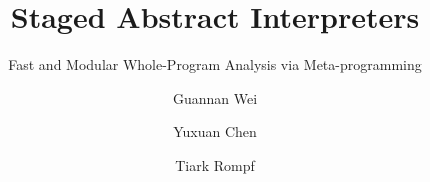 \documentclass[acmsmall, screen]{acmart}\settopmatter{}
\begin{document}
\title{Staged Abstract Interpreters}         %
\subtitle{Fast and Modular Whole-Program Analysis via Meta-programming}                     %


\author{Guannan Wei}
\author{Yuxuan Chen}
\author{Tiark Rompf}

\end{document}

